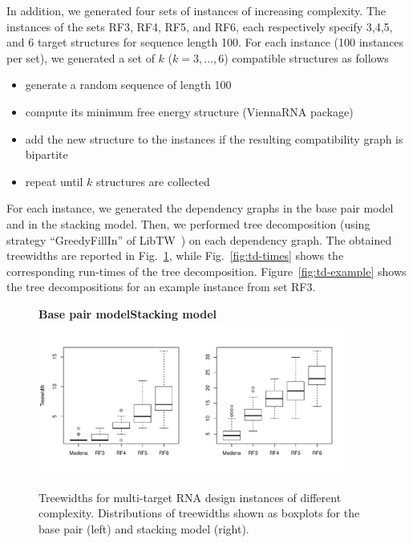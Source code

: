 \documentclass{bioinfo}
\begin{document}
In addition, we generated four sets of instances of increasing
complexity. The instances of the sets RF3, RF4, RF5, and RF6, each
respectively specify 3,4,5, and 6 target structures for sequence
length 100.  For each instance (100 instances per set), we generated a
set of $k$ ($k=3,\dots,6$) compatible structures as follows
\begin{itemize}
\item generate a random sequence of length 100
\item compute its minimum free energy structure (ViennaRNA package)
\item add the new structure to the instances if the resulting compatibility graph is bipartite
\item repeat until $k$ structures are collected
\end{itemize}
For each instance, we generated the dependency graphs in the base pair
model and in the stacking model. Then, we performed tree decomposition
(using strategy ``GreedyFillIn'' of LibTW~\cite{Dijk2006}) on each dependency
graph. The obtained treewidths are reported in
Fig.~\ref{fig:td-widths}, while Fig.~\ref{fig:td-times} shows the
corresponding run-times of the tree decomposition.
Figure~\ref{fig:td-example} shows the tree decompositions for an example
instance from set RF3.


\begin{figure}
  \hspace*{2cm}\textbf{Base pair model}\hspace{4.75cm}\textbf{Stacking model}\\[-28pt]
  \centering\includegraphics[width=0.9\textwidth]{Figs/td-widths}
  \vspace*{-24pt}
  \caption{Treewidths for multi-target RNA design instances of
    different complexity. Distributions of treewidths shown as boxplots for the base pair (left) and stacking model (right).}
  \label{fig:td-widths}
\end{figure}
\end{document}
